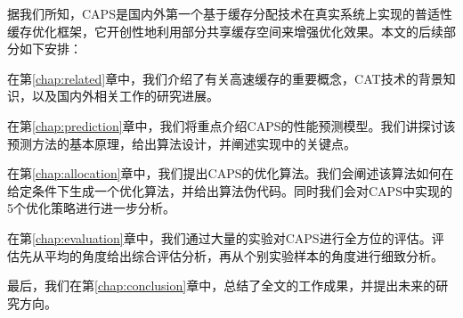 据我们所知，CAPS是国内外第一个基于缓存分配技术在真实系统上实现的普适性缓存优化框架，它开创性地利用部分共享缓存空间来增强优化效果。本文的后续部分如下安排：

在第\ref{chap:related}章中，我们介绍了有关高速缓存的重要概念，CAT技术的背景知识，以及国内外相关工作的研究进展。

在第\ref{chap:prediction}章中，我们将重点介绍CAPS的性能预测模型。我们讲探讨该预测方法的基本原理，给出算法设计，并阐述实现中的关键点。

在第\ref{chap:allocation}章中，我们提出CAPS的优化算法。我们会阐述该算法如何在给定条件下生成一个优化算法，并给出算法伪代码。同时我们会对CAPS中实现的5个优化策略进行进一步分析。

在第\ref{chap:evaluation}章中，我们通过大量的实验对CAPS进行全方位的评估。评估先从平均的角度给出综合评估分析，再从个别实验样本的角度进行细致分析。

最后，我们在第\ref{chap:conclusion}章中，总结了全文的工作成果，并提出未来的研究方向。